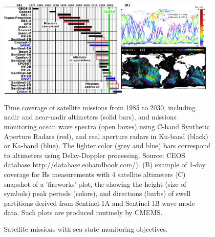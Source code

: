 \begin{figure}[htb]
\centerline{\includegraphics[width=\textwidth]{FIGS_CH_SAT/missions.pdf}}
  \caption{Satellite missions with sea state monitoring objectives.}
    {Time coverage of satellite missions from 1985 to 2030, including nadir and near-nadir altimeters (solid bars), and missions monitoring ocean wave spectra (open boxes) using C-band Synthetic Aperture Radars (red), and real aperture radars in Ku-band (black) or Ka-band (blue). The lighter color (grey and blue) bars correspond to altimeters using Delay-Doppler processing. Source: CEOS database
    \url{http://database.eohandbook.com/}). (B) example of 1-day coverage for Hs measurements with 4 satellite altimeters 
    (C) snapshot of a 'fireworks' plot, the showing the height (size of symbols) peak periods (colors), and directions (barbs) of 
    swell partitions derived from Sentinel-1A and Sentinel-1B wave mode data. Such plots are produced routinely by CMEMS.}\label{fig:satellite}
\end{figure}



